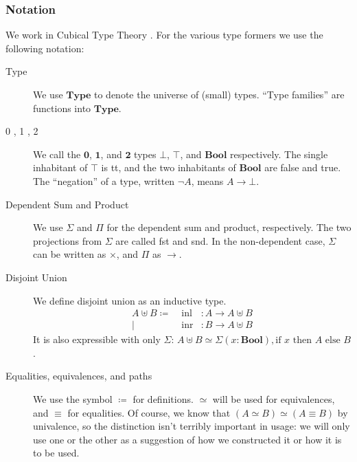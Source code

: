 \subsubsection{Notation}
We work in Cubical Type Theory \cite{cohenCubicalTypeTheory2016}.
For the various type formers we use the following notation:
\begin{description}
  \item[Type] We use \(\mathbf{Type}\) to denote the universe of (small) types.
    ``Type families'' are functions into \(\mathbf{Type}\).
  \item[0 , 1 , 2] We call the \(\mathbf{0}\), \(\mathbf{1}\), and
    \(\mathbf{2}\) types \(\bot\), \(\top\), and \(\mathbf{Bool}\) respectively.
    The single inhabitant of \(\top\) is tt, and the two inhabitants of
    \(\mathbf{Bool}\) are false and true.
    The ``negation'' of a type, written \(\neg A\), means \(A \rightarrow
    \bot\).
  \item[Dependent Sum and Product] We use \(\Sigma\) and \(\Pi\) for the
    dependent sum and product, respectively.
    The two projections from \(\Sigma\) are called fst and snd.
    In the non-dependent case, \(\Sigma\) can be written as \(\times\), and
    \(\Pi\) as \(\rightarrow\).
  \item[Disjoint Union] We define disjoint union as an inductive type.
    \begin{equation}
      \begin{aligned}
        A \uplus B \coloneqq & \;
        \text{inl} &: A \rightarrow A \uplus B \\
        | & \;  \text{inr} &: B \rightarrow A \uplus B
      \end{aligned}
    \end{equation}
    It is also expressible with only \(\Sigma\):
    \(A \uplus B \simeq \Sigma(x : \mathbf{Bool}) , \text{if } x \text{ then
    } A \text{ else } B \).
  \item[Equalities, equivalences, and paths] We use the symbol \(\coloneqq\)
    for definitions.
    \(\simeq\) will be used for equivalences, and \(\equiv\) for equalities.
    Of course, we know that \((A \simeq B) \simeq (A \equiv B)\) by univalence,
    so the distinction isn't terribly important in usage: we will only use one
    or the other as a suggestion of how we constructed it or how it is to be
    used.
\end{description}
